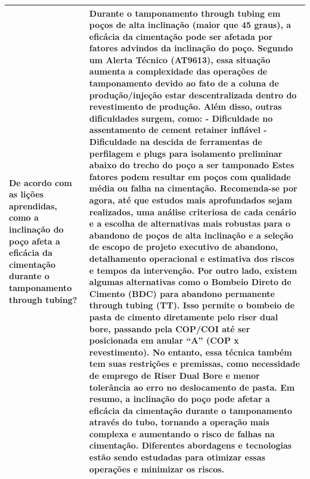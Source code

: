 \begin{landscape}
\begin{longtable}{|p{3cm}|p{22cm}|}
De acordo com as lições aprendidas, como a inclinação do poço afeta a eficácia da cimentação durante o tamponamento through tubing? & Durante o tamponamento through tubing em poços de alta inclinação (maior que 45 graus), a eficácia da cimentação pode ser afetada por fatores advindos da inclinação do poço. Segundo um Alerta Técnico (AT9613), essa situação aumenta a complexidade das operações de tamponamento devido ao fato de a coluna de produção/injeção estar descentralizada dentro do revestimento de produção. 
        \newline        Além disso, outras dificuldades surgem, como:
        \newline        - Dificuldade no assentamento de cement retainer inflável
        - Dificuldade na descida de ferramentas de perfilagem e plugs para isolamento preliminar abaixo do trecho do poço a ser tamponado
        \newline        Estes fatores podem resultar em poços com qualidade média ou falha na cimentação. Recomenda-se por agora, até que estudos mais aprofundados sejam realizados, uma análise criteriosa de cada cenário e a escolha de alternativas mais robustas para o abandono de poços de alta inclinação e a seleção de escopo de projeto executivo de abandono, detalhamento operacional e estimativa dos riscos e tempos da intervenção.
        \newline        Por outro lado, existem algumas alternativas como o Bombeio Direto de Cimento (BDC) para abandono permanente through tubing (TT). Isso permite o bombeio de pasta de cimento diretamente pelo riser dual bore, passando pela COP/COI até ser posicionada em anular “A” (COP x revestimento). No entanto, essa técnica também tem suas restrições e premissas, como necessidade de emprego de Riser Dual Bore e menor tolerância ao erro no deslocamento de pasta.
        \newline        Em resumo, a inclinação do poço pode afetar a eficácia da cimentação durante o tamponamento através do tubo, tornando a operação mais complexa e aumentando o risco de falhas na cimentação. Diferentes abordagens e tecnologias estão sendo estudadas para otimizar essas operações e minimizar os riscos. \\ \hline


\end{longtable}
\end{landscape}
